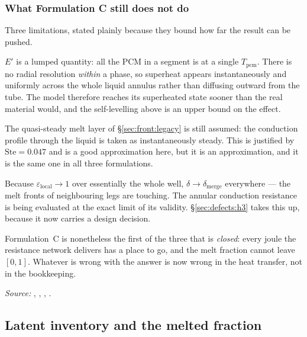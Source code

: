 \subsubsection{What Formulation C still does not do}

Three limitations, stated plainly because they bound how far the result can be
pushed.

\begin{description}[leftmargin=1.7em,itemsep=3pt]
\item[One temperature per segment.] $E'$ is a lumped quantity: all the PCM in a
  segment is at a single $T_{\mathrm{pcm}}$. There is no radial resolution
  \emph{within} a phase, so superheat appears instantaneously and uniformly
  across the whole liquid annulus rather than diffusing outward from the tube.
  The model therefore reaches its superheated state sooner than the real
  material would, and the self-levelling above is an upper bound on the effect.
\item[H1 is inherited, not repaired.] The quasi-steady melt layer of
  \S\ref{sec:front:legacy} is still assumed: the conduction profile through the
  liquid is taken as instantaneously steady. This is justified by
  $\mathrm{Ste}=\num{0.047}$ and is a good approximation here, but it is an
  approximation, and it is the same one in all three formulations.
\item[H3 is now \emph{saturated}.] Because $\varepsilon_{\mathrm{local}}\to1$
  over essentially the whole well, $\delta \to \delta_{\mathrm{merge}}$
  everywhere --- the melt fronts of neighbouring legs are touching. The annular
  conduction resistance is being evaluated at the exact limit of its validity.
  \S\ref{sec:defects:h3} takes this up, because it now carries a design
  decision.
\end{description}

Formulation~C is nonetheless the first of the three that is \emph{closed}: every
joule the resistance network delivers has a place to go, and the melt fraction
cannot leave $[0,1]$. Whatever is wrong with the answer is now wrong in the heat
transfer, not in the bookkeeping.

\emph{Source:} , ,
, .

\subsection{Latent inventory and the melted fraction}
\label{sec:front:inventory}

